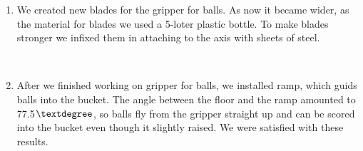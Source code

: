 \begin{enumerate}
\begin{enumerate}
		\item We created new blades for the gripper for balls. As now it became wider, as the material for blades we used a 5-loter plastic bottle. To make blades stronger we infixed them in attaching to the axis with sheets of steel.
		\begin{figure}[H]
			\begin{minipage}[h]{0.2\linewidth}
				\center  
			\end{minipage}
			\begin{minipage}[h]{0.6\linewidth}
				\caption{}
			\end{minipage}
		\end{figure}
		
        \item After we finished working on gripper for balls, we installed ramp, which guids balls into the bucket. The angle between the floor and the ramp amounted to 77.5${\textdegree}$, so balls fly from the gripper straight up and can be scored into the bucket even though it slightly raised. We were satisfied with these results.
        \begin{figure}[H]
	  	  \begin{minipage}[h]{0.2\linewidth}
	  	    \center  
	  	  \end{minipage}
	  	  \begin{minipage}[h]{0.6\linewidth}
	  		\caption{}
	  	  \end{minipage}
	   \end{figure}
	   

\end{enumerate}
\end{enumerate}
